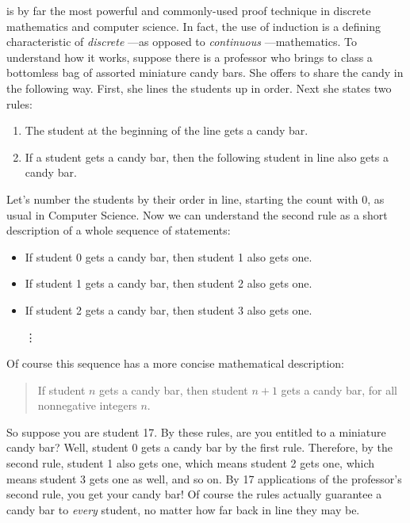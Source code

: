 \label{induction_chap}

 is by far the most powerful and commonly-used proof technique in
discrete mathematics and computer science.  In fact, the use of induction
is a defining characteristic of \emph{discrete} ---as opposed to
\emph{continuous} ---mathematics.
%
To understand how it works, suppose there is a professor who brings
to class a bottomless bag of assorted miniature candy bars.  She offers to
share the candy in the following way.  First, she lines the students up in
order.  Next she states two rules:

\begin{enumerate}
\item The student at the beginning of the line gets a candy bar.
\item If a student gets a candy bar, then the following student in line
  also gets a candy bar.
\end{enumerate}
%
Let's number the students by their order in line, starting the count with
0, as usual in Computer Science.  Now we can understand the second rule as
a short description of a whole sequence of statements:
%
\begin{itemize}
\item If student 0 gets a candy bar, then student 1 also gets one.
\item If student 1 gets a candy bar, then student 2 also gets one.
\item If student 2 gets a candy bar, then student 3 also gets one.

\hspace{1.2in} \vdots
\end{itemize}
%
Of course this sequence has a more concise mathematical description:
\begin{quote}
  If student $n$ gets a candy bar, then student $n+1$ gets a
  candy bar, for all nonnegative integers $n$.
\end{quote}
So suppose you are student 17.  By these rules, are you entitled to a
miniature candy bar?  Well, student 0 gets a candy bar by the first rule.
Therefore, by the second rule, student 1 also gets one, which means
student 2 gets one, which means student 3 gets one as well, and so on.  By
17 applications of the professor's second rule, you get your candy bar!
Of course the rules actually guarantee a candy bar to \emph{every}
student, no matter how far back in line they may be.


